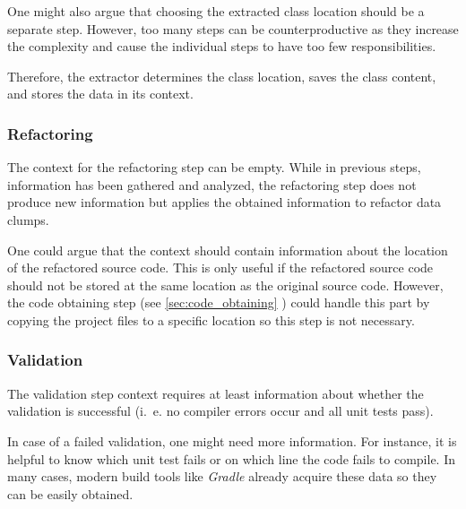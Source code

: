 One might also argue that choosing the extracted class location should be a separate step. 
However, too many steps can be counterproductive as they increase the complexity and cause the individual steps to have too few responsibilities.

Therefore, the extractor determines the class location, saves the class content, and stores the data in its context. 


\subsubsection{Refactoring}
The context for the refactoring step  can be empty. While in previous steps, information has been gathered and analyzed, the refactoring step does not produce new information but applies the obtained information to refactor data clumps. 

One could argue that the context should contain information about the location of the refactored source code. This is only useful if the refactored source code should not be stored at the same location as the original source code.  However, the code obtaining step (see \ref{sec:code_obtaining}
) could handle this part by copying the project files to a specific location so this step is not necessary. 

\subsubsection{Validation}

The validation step context requires at least information about whether the validation is successful (i.~e. no compiler errors occur and all unit tests pass). 

In case of a failed validation, one might need more information. For instance, it is helpful to know which unit test fails or on which line the code fails to compile. In many cases, modern build tools like \textit{Gradle} already acquire these data so they can be easily obtained. 






